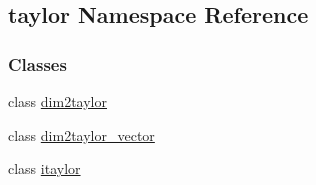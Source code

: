 \hypertarget{namespacetaylor}{\subsection{taylor \-Namespace \-Reference}
\label{namespacetaylor}
}
\subsubsection*{\-Classes}
\begin{DoxyCompactItemize}
\item 
class \hyperlink{classtaylor_1_1dim2taylor}{dim2taylor}
\item 
class \hyperlink{classtaylor_1_1dim2taylor__vector}{dim2taylor\-\_\-vector}
\item 
class \hyperlink{classtaylor_1_1itaylor}{itaylor}
\end{DoxyCompactItemize}

